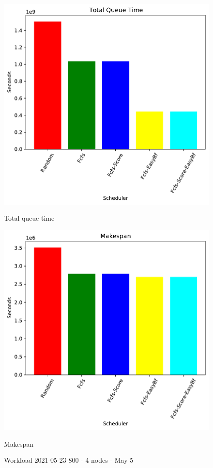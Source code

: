 \documentclass[a4paper]{article}
\begin{document}
\begin{figure}[H]
	\begin{minipage}[b]{0.5\linewidth}\centering\includegraphics[width=1.11\linewidth]{MBSS/plot/2021-05-23-800_Total_queue_time.pdf}\caption{Total queue time}\vspace{4ex}\end{minipage}
	\begin{minipage}[b]{0.5\linewidth}\centering\includegraphics[width=1.11\linewidth]{MBSS/plot/2021-05-23-800_Makespan.pdf}\caption{Makespan}\vspace{4ex}\end{minipage}\caption{Workload 2021-05-23-800 - 4 nodes - May 5}\end{figure}
\end{document}
